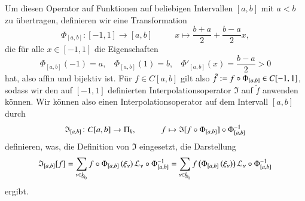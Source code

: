       Um diesen Operator auf Funktionen auf beliebigen Intervallen $[a,b]$ mit $a < b$ zu übertragen, definieren wir eine Transformation
      \begin{equation*}
	\Phi_{[a,b]} \colon [-1,1] \to [a,b] \ \ \ \ \ \ \ \ \ \ \ \  x \mapsto \frac{b + a}{2} + \frac{b - a}{2} x,
      \end{equation*}
      die für alle $x \in [-1,1]$ die Eigenschaften
      \begin{equation*}
	\Phi_{[a,b]}\left(-1\right) = a , \ \ \ \ \Phi_{[a,b]}\left(1\right) = b , \ \ \ \ \Phi'_{[a,b]}\left(x\right) = \frac{b - a}{2} > 0
      \end{equation*}
      hat, also affin und bijektiv ist. Für $f \in C[a,b]$ gilt also $\tilde f := f \circ \Phi_{[a,b]} \in C[-1,1]$, sodass wir den auf $[-1,1]$ definierten Interpolationsoperator $\mathfrak{I}$
      auf $\tilde f$ anwenden können. Wir können also einen Interpolationsoperator auf dem Intervall $[a,b]$ durch
      \begin{equation*}
	\mathfrak{I}_{[a,b]} \colon C[a,b] \to \Pi_k, \ \ \ \ \ \ \ \ \ \ \ \ f \mapsto \mathfrak{I}[f \circ \Phi_{[a,b]}] \circ \Phi_{[a,b]}^{-1}
      \end{equation*}
      definieren, was, die Definition von $\mathfrak{I}$ eingesetzt, die Darstellung
      \begin{equation*}
	\mathfrak{I}_{[a,b]}[f] = \sum_{\nu \in \nullhaken{k}} f \after \Phi_{[a,b]}\left(\xi_\nu\right) \lag_\nu \after \Phi_{[a,b]}^{-1} = 
				 \sum_{\nu \in \nullhaken{k}} f \left( \Phi_{[a,b]}\left(\xi_\nu\right)\right)     \lag_\nu \after \Phi_{[a,b]}^{-1}
      \end{equation*}
      ergibt.
      
